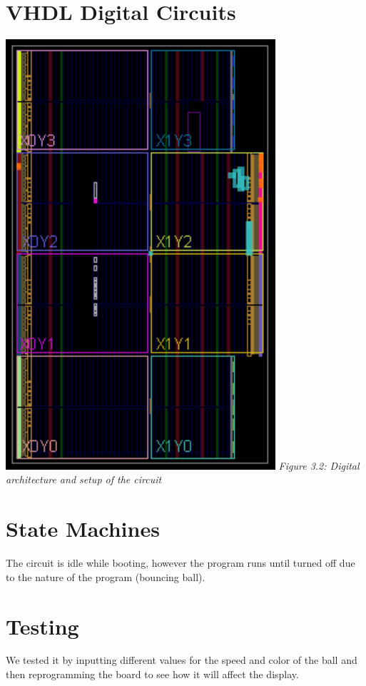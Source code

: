  \section{VHDL Digital Circuits}
    \includegraphics[width=100mm]{lab3/lab3imgthing.png}
    \emph{Figure 3.2: Digital architecture and setup of the circuit}
 \section{State Machines}
    The circuit is idle while booting, however the program runs until turned off due to the nature of the program (bouncing ball). 
 \section{Testing}
    We tested it by inputting different values for the speed and color of the ball and then reprogramming the board to see how it will affect the display. 
